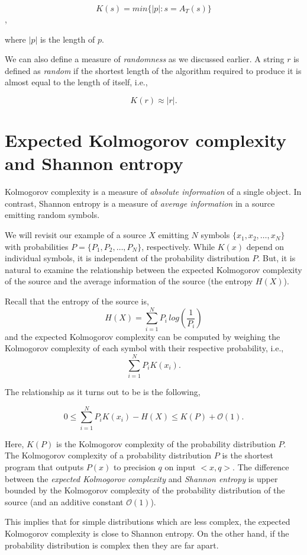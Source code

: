 \documentclass[]{article}
\begin{document}
$$K(s) = min\{|p|: s=A_T(s)\}$$,

where $|p|$ is the length of $p$. 

We can also define a measure of \emph{randomness} as we discussed earlier. A string $r$ is defined as \emph{random} if the shortest length of the algorithm required to produce it is almost equal to the length of itself, i.e.,

$$K(r)\approx |r|.$$  


\section{Expected Kolmogorov complexity and Shannon entropy}
Kolmogorov complexity is a measure of \emph{absolute information} of a single object. In contrast, Shannon entropy is a measure of \emph{average information} in a source emitting random symbols. 

We will revisit our example of a source $X$ emitting $N$ symbols $\{x_1,x_2,\dots,x_N\}$ with probabilities $P=\{P_1,P_2,\dots,P_N\}$, respectively. While $K(x)$ depend on individual symbols, it is independent of the probability distribution $P$. But, it is natural to examine the relationship between the expected Kolmogorov complexity of the source and the average information of the source (the entropy $H(X)$). 

Recall that the entropy of the source is,
$$H(X) = \sum_{i=1}^{N}P_i\hspace{2pt}log\left(\frac{1}{P_i}\right)$$
and the expected Kolmogorov complexity can be computed by weighing the Kolmogorov complexity of each symbol with their respective probability, i.e., 
$$\sum_{i=1}^{N}P_iK(x_i).$$ 

The relationship as it turns out to be is the following, 

$$0\leq \sum_{i=1}^{N}P_iK(x_i) - H(X) \leq K(P) + \mathcal{O}(1).$$

Here, $K(P)$ is the Kolmogorov complexity of the probability distribution $P$. The Kolmogorov complexity of a probability distribution $P$ is the shortest program that outputs $P(x)$ to precision $q$ on input $<x,q>$\cite{alginfo}. The difference between the \emph{expected Kolmogorov complexity} and \emph{Shannon entropy} is upper bounded by the Kolmogorov complexity of the probability distribution of the source (and an additive constant $\mathcal{O}(1)$).

This implies that for simple distributions which are less complex, the expected Kolmogorov complexity is close to Shannon entropy. On the other hand, if the probability distribution is complex then they are far apart. 

\newpage

 
\end{document}
